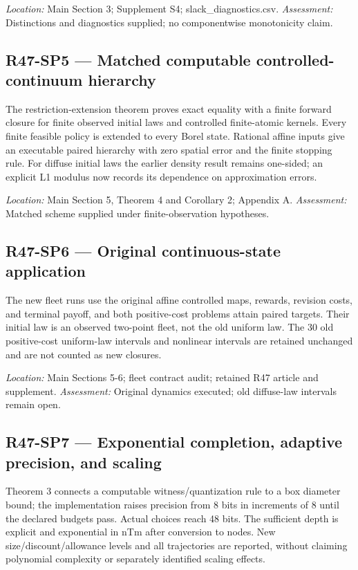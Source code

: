 \noindent\emph{Location:} Main Section 3; Supplement S4; slack\_diagnostics.csv. \emph{Assessment:} Distinctions and diagnostics supplied; no componentwise monotonicity claim.

\subsection{R47-SP5 --- Matched computable controlled-continuum hierarchy}
The restriction-extension theorem proves exact equality with a finite forward closure for finite observed initial laws and controlled finite-atomic kernels. Every finite feasible policy is extended to every Borel state. Rational affine inputs give an executable paired hierarchy with zero spatial error and the finite stopping rule. For diffuse initial laws the earlier density result remains one-sided; an explicit L1 modulus now records its dependence on approximation errors.

\noindent\emph{Location:} Main Section 5, Theorem 4 and Corollary 2; Appendix A. \emph{Assessment:} Matched scheme supplied under finite-observation hypotheses.

\subsection{R47-SP6 --- Original continuous-state application}
The new fleet runs use the original affine controlled maps, rewards, revision costs, and terminal payoff, and both positive-cost problems attain paired targets. Their initial law is an observed two-point fleet, not the old uniform law. The 30 old positive-cost uniform-law intervals and nonlinear intervals are retained unchanged and are not counted as new closures.

\noindent\emph{Location:} Main Sections 5-6; fleet contract audit; retained R47 article and supplement. \emph{Assessment:} Original dynamics executed; old diffuse-law intervals remain open.

\subsection{R47-SP7 --- Exponential completion, adaptive precision, and scaling}
Theorem 3 connects a computable witness/quantization rule to a box diameter bound; the implementation raises precision from 8 bits in increments of 8 until the declared budgets pass. Actual choices reach 48 bits. The sufficient depth is explicit and exponential in nTm after conversion to nodes. New size/discount/allowance levels and all trajectories are reported, without claiming polynomial complexity or separately identified scaling effects.

